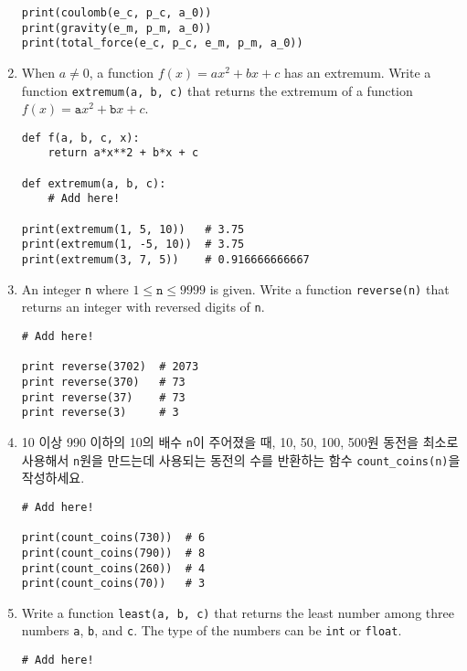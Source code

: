 \documentclass[../main.tex]{subfiles}
\begin{document}
\begin{enumerate}
\begin{verbatim}
print(coulomb(e_c, p_c, a_0))
print(gravity(e_m, p_m, a_0))
print(total_force(e_c, p_c, e_m, p_m, a_0))
\end{verbatim}

\item When $a \neq 0$, a function $f(x) = ax^2 + bx + c$ has an extremum.
Write a function \texttt{extremum(a, b, c)} that returns the extremum of a function $f(x) = \texttt{a}x^2 + \texttt{b}x + c$.
\begin{verbatim}
def f(a, b, c, x):
    return a*x**2 + b*x + c

def extremum(a, b, c):
    # Add here!

print(extremum(1, 5, 10))   # 3.75
print(extremum(1, -5, 10))  # 3.75
print(extremum(3, 7, 5))    # 0.916666666667
\end{verbatim}

\item An integer \texttt{n} where $1 \leq \texttt{n} \leq 9999$ is given. Write
  a function \texttt{reverse(n)} that returns an integer with reversed digits
  of \texttt{n}.
\begin{verbatim}
# Add here!

print reverse(3702)  # 2073
print reverse(370)   # 73
print reverse(37)    # 73
print reverse(3)     # 3
\end{verbatim}

\item 10 이상 990 이하의 10의 배수 \verb|n|이 주어졌을 때, 10, 50, 100, 500원
  동전을 최소로 사용해서 \verb|n|원을 만드는데 사용되는 동전의 수를 반환하는
  함수 \verb|count_coins(n)|을 작성하세요.
\begin{verbatim}
# Add here!

print(count_coins(730))  # 6
print(count_coins(790))  # 8
print(count_coins(260))  # 4
print(count_coins(70))   # 3
\end{verbatim}

\item Write a function \texttt{least(a, b, c)} that returns the least number
  among three numbers \texttt{a}, \texttt{b}, and \texttt{c}.  The type of the
  numbers can be \texttt{int} or \texttt{float}.
\begin{verbatim}
# Add here!


\end{verbatim}
\end{enumerate}
\end{document}
